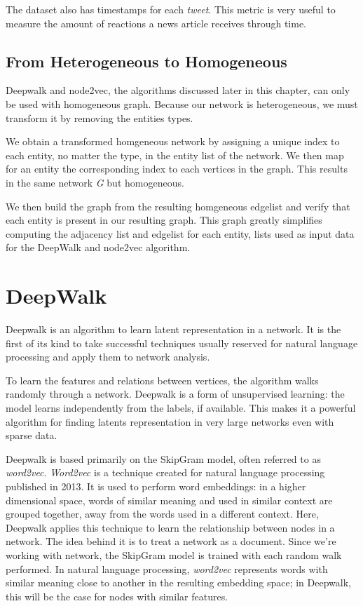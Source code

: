 The dataset also has timestamps for each \textit{tweet}.
This metric is very useful to measure the amount of reactions a news article receives through time.

\subsection{From Heterogeneous to Homogeneous}
\label{sub:h2h}

Deepwalk and node2vec, the algorithms discussed later in this chapter, can only be used with homogeneous graph.
Because our network is heterogeneous, we must transform it by removing the entities types.

We obtain a transformed homgeneous network by assigning a unique index to each entity, no matter the type, in the entity list of the network.
We then map for an entity the corresponding index to each vertices in the graph.
This results in the same network \textit{G} but homogeneous.

We then build the graph from the resulting homgeneous edgelist and verify that each entity is present in our resulting graph.
This graph greatly simplifies computing the adjacency list and edgelist for each entity, lists used as input data for the DeepWalk and node2vec algorithm.

\newpage
\section{DeepWalk}

Deepwalk is an algorithm to learn latent representation in a network.
It is the first of its kind to take successful techniques usually reserved for natural language processing and apply them to network analysis.

To learn the features and relations between vertices, the algorithm walks randomly through a network.
Deepwalk is a form of unsupervised learning: the model learns independently from the labels, if available.
This makes it a powerful algorithm for finding latents representation in very large networks even with sparse data.

Deepwalk is based primarily on the SkipGram model, often referred to as \textit{word2vec}. 
\textit{Word2vec} is a technique created for natural language processing published in 2013.
It is used to perform word embeddings: in a higher dimensional space, words of similar meaning and used in similar context are grouped together, away from the words used in a different context.
Here, Deepwalk applies this technique to learn the relationship between nodes in a network.
The idea behind it is to treat a network as a document.
Since we're working with network, the SkipGram model is trained with each random walk performed.
In natural language processing, \textit{word2vec} represents words with similar meaning close to another in the resulting embedding space; in Deepwalk, this will be the case for nodes with similar features.

